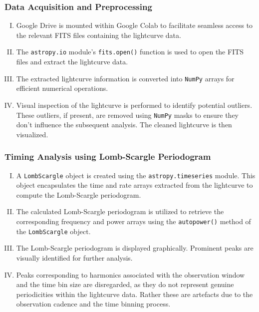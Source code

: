     		\subsubsection{Data Acquisition and Preprocessing}
    			\begin{enumerate}[I.]
    				\item Google Drive is mounted within Google Colab to facilitate seamless access to the relevant FITS files containing the lightcurve data.
    				\item The \texttt{astropy.io} module's \texttt{fits.open()} function is used to open the FITS files and extract the lightcurve data.
    				\item The extracted lightcurve information is converted into \texttt{NumPy} arrays for efficient numerical operations.
    				\item Visual inspection of the lightcurve is performed to identify potential outliers. These outliers, if present, are removed using \texttt{NumPy} masks to ensure they don't influence the subsequent analysis. The cleaned lightcurve is then visualized.
    			\end{enumerate}
    		
    		\subsubsection{Timing Analysis using Lomb-Scargle Periodogram}
    			\begin{enumerate}[I.]
    				\item A \texttt{LombScargle} object is created using the \texttt{astropy.timeseries} module. This object encapsulates the time and rate arrays extracted from the lightcurve to compute the Lomb-Scargle periodogram.
    				\item The calculated Lomb-Scargle periodogram is utilized to retrieve the corresponding frequency and power arrays using the \texttt{autopower()} method of the \texttt{LombScargle} object.
    				\item The Lomb-Scargle periodogram is displayed graphically. Prominent peaks are visually identified for further analysis.
    				\item Peaks corresponding to harmonics associated with the observation window and the time bin size are disregarded, as they do not represent genuine periodicities within the lightcurve data. Rather these are artefacts due to the observation cadence and the time binning process.
    			\end{enumerate}
    		
